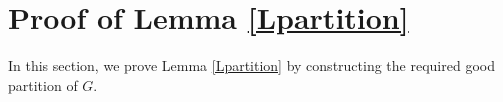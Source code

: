 \documentclass[11pt, a4paper]{article}
\theoremstyle{definition}
\newcommand{\<}{\subseteq}
\begin{document}








\section{Proof of Lemma \ref{Lpartition}}\label{section6}
In this section, we prove Lemma \ref{Lpartition} by constructing the required good partition of $G$.
\end{document}
